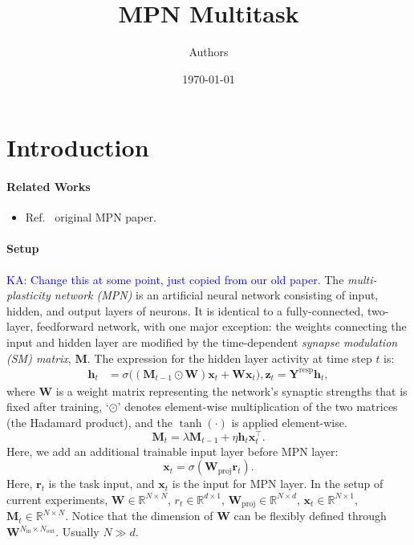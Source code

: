 \documentclass{article}
\title{MPN Multitask}
\date{\today}
\author[1]{Authors}
\newcommand{\KA}[1]{\textcolor{blue}{KA: #1}}
\begin{document}
\maketitle

\begin{abstract}

\end{abstract}

\section{Introduction}

\paragraph{Related Works}
\begin{itemize}
    \item Ref.~\cite{aitken2023neural} original MPN paper.
\end{itemize}

\paragraph{Setup}

\KA{Change this at some point, just copied from our old paper.}
The \emph{multi-plasticity network (MPN)} is an artificial neural network consisting of input, hidden, and output layers of neurons.
It is identical to a fully-connected, two-layer, feedforward network, with one major exception: the weights connecting the input and hidden layer are modified by the time-dependent \emph{synapse modulation (SM) matrix}, $\mathbf{M}$.
The expression for the hidden layer activity at time step $t$ is:
\begin{align}
    \label{eq:mpn}
    \mathbf{h}_{t}	&=
    \sigma\big(\left(\mathbf{M}_{t-1}\odot\mathbf{W}\right)\mathbf{x}_{t}+\mathbf{W}\mathbf{x}_{t}\big), \mathbf{z}_t = \mathbf{Y}^{\text{resp}}\mathbf{h}_t,
\end{align}
where $\mathbf{W}$ is a weight matrix representing the network's synaptic strengths that is fixed after training, `$\odot$' denotes element-wise multiplication of the two matrices (the Hadamard product), and the $\tanh(\cdot)$ is applied element-wise.
\begin{equation}
    \mathbf{M}_t = \lambda \mathbf{M}_{t-1} + \eta \mathbf{h}_t \mathbf{x}_t^{\top}.
\end{equation}
Here, we add an additional trainable input layer before MPN layer:
\begin{equation}
    \mathbf{x}_t = \sigma(\mathbf{W}_{\text{proj}}\mathbf{r}_t).
\end{equation}
Here, $\mathbf{r}_t$ is the task input, and $\mathbf{x}_t$ is the input for MPN layer.
In the setup of current experiments, $\mathbf{W}\in \mathbb{R}^{N \times N}$, $r_t \in \mathbb{R}^{d \times 1}$, $\mathbf{W}_{\text{proj}} \in \mathbb{R}^{N \times d}$, $\mathbf{x}_t \in \mathbb{R}^{N \times 1}$, $\mathbf{M}_t \in \mathbb{R}^{N \times N}$. Notice that the dimension of $\mathbf{W}$ can be flexibly defined through $\mathbf{W}^{N_{\text{in}} \times N_{\text{out}}}$. Usually $N \gg d$.
\end{document}
